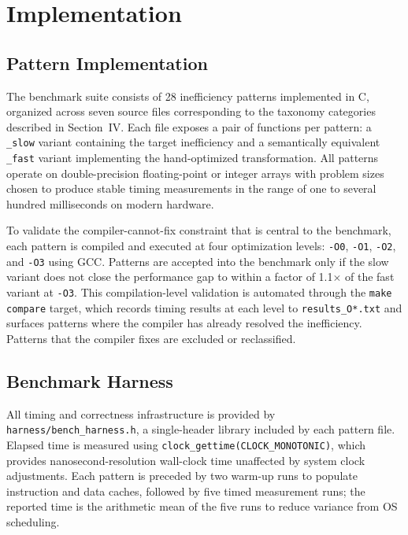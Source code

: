 \section{Implementation}

\subsection{Pattern Implementation}

The benchmark suite consists of 28 inefficiency patterns implemented in C, organized across seven source files corresponding to the taxonomy categories described in Section~IV. Each file exposes a pair of functions per pattern: a \texttt{\_slow} variant containing the target inefficiency and a semantically equivalent \texttt{\_fast} variant implementing the hand-optimized transformation. All patterns operate on double-precision floating-point or integer arrays with problem sizes chosen to produce stable timing measurements in the range of one to several hundred milliseconds on modern hardware.

To validate the compiler-cannot-fix constraint that is central to the benchmark, each pattern is compiled and executed at four optimization levels: \texttt{-O0}, \texttt{-O1}, \texttt{-O2}, and \texttt{-O3} using GCC. Patterns are accepted into the benchmark only if the slow variant does not close the performance gap to within a factor of 1.1$\times$ of the fast variant at \texttt{-O3}. This compilation-level validation is automated through the \texttt{make compare} target, which records timing results at each level to \texttt{results\_O*.txt} and surfaces patterns where the compiler has already resolved the inefficiency. Patterns that the compiler fixes are excluded or reclassified.

\subsection{Benchmark Harness}

All timing and correctness infrastructure is provided by \texttt{harness/bench\_harness.h}, a single-header library included by each pattern file. Elapsed time is measured using \texttt{clock\_gettime(CLOCK\_MONOTONIC)}, which provides nanosecond-resolution wall-clock time unaffected by system clock adjustments. Each pattern is preceded by two warm-up runs to populate instruction and data caches, followed by five timed measurement runs; the reported time is the arithmetic mean of the five runs to reduce variance from OS scheduling.

